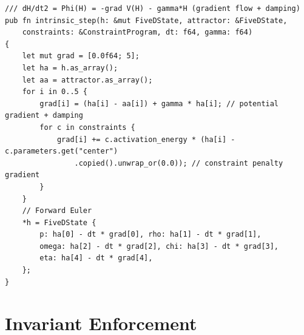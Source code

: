 \documentclass[10pt,a4paper]{article}
\theoremstyle{definition}\newtheorem{definition}{Def}[section]
\theoremstyle{plain}\newtheorem{theorem}{Thm}[section]
\begin{document}
\begin{lstlisting}[style=rust]
/// dH/dt2 = Phi(H) = -grad V(H) - gamma*H (gradient flow + damping)
pub fn intrinsic_step(h: &mut FiveDState, attractor: &FiveDState,
    constraints: &ConstraintProgram, dt: f64, gamma: f64)
{
    let mut grad = [0.0f64; 5];
    let ha = h.as_array();
    let aa = attractor.as_array();
    for i in 0..5 {
        grad[i] = (ha[i] - aa[i]) + gamma * ha[i]; // potential gradient + damping
        for c in constraints {
            grad[i] += c.activation_energy * (ha[i] - c.parameters.get("center")
                .copied().unwrap_or(0.0)); // constraint penalty gradient
        }
    }
    // Forward Euler
    *h = FiveDState {
        p: ha[0] - dt * grad[0], rho: ha[1] - dt * grad[1],
        omega: ha[2] - dt * grad[2], chi: ha[3] - dt * grad[3],
        eta: ha[4] - dt * grad[4],
    };
}
\end{lstlisting}

\section{Invariant Enforcement}
\label{sec:invariants}
\end{document}
